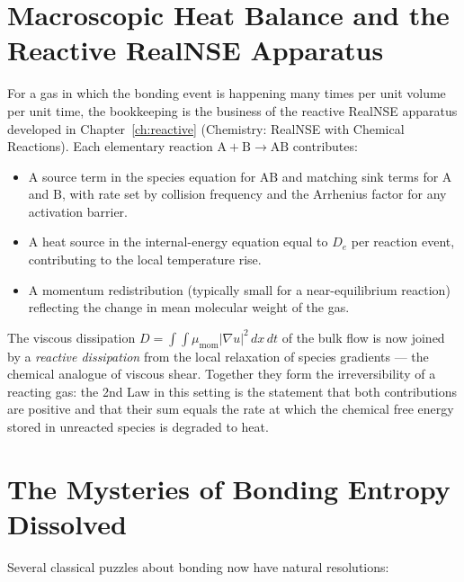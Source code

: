 \section{Macroscopic Heat Balance and the Reactive RealNSE Apparatus}

For a gas in which the bonding event is happening many times per unit
volume per unit time, the bookkeeping is the business of the reactive RealNSE
apparatus developed in Chapter~\ref{ch:reactive} (Chemistry: RealNSE with
Chemical Reactions). Each elementary reaction $\mathrm{A} + \mathrm{B} \to
\mathrm{AB}$ contributes:

\begin{itemize}
\item A source term in the species equation for $\mathrm{AB}$ and matching
sink terms for $\mathrm{A}$ and $\mathrm{B}$, with rate set by collision
frequency and the Arrhenius factor for any activation barrier.

\item A heat source in the internal-energy equation equal to $D_e$ per
reaction event, contributing to the local temperature rise.

\item A momentum redistribution (typically small for a near-equilibrium
reaction) reflecting the change in mean molecular weight of the gas.
\end{itemize}

The viscous dissipation $D = \int\!\int\mu_{\mathrm{mom}}|\nabla u|^2\,dx\,dt$
of the bulk flow is now joined by a \emph{reactive dissipation} from the
local relaxation of species gradients --- the chemical analogue of viscous
shear. Together they form the irreversibility of a reacting gas: the 2nd
Law in this setting is the statement that both contributions are positive
and that their sum equals the rate at which the chemical free energy stored
in unreacted species is degraded to heat.

\section{The Mysteries of Bonding Entropy Dissolved}

Several classical puzzles about bonding now have natural resolutions:

